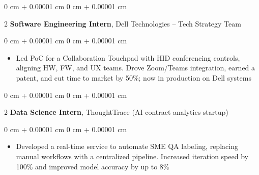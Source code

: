 \documentclass[10pt, letterpaper]{article}
\newenvironment{highlights}{
    \begin{itemize}[
        topsep=0.10 cm,
        parsep=0.10 cm,
        partopsep=0pt,
        itemsep=0pt,
        leftmargin=0 cm + 10pt
    ]
}{
    \end{itemize}
} %
\newenvironment{onecolentry}{
    \begin{adjustwidth}{
        0 cm + 0.00001 cm
    }{
        0 cm + 0.00001 cm
    }
}{
    \end{adjustwidth}
} %
\newenvironment{twocolentry}[2][]{
    \onecolentry
    \def\secondColumn{#2}
    \setcolumnwidth{\fill, 4.5 cm}
    \begin{paracol}{2}
}{
    \switchcolumn \raggedleft \secondColumn
    \end{paracol}
    \endonecolentry
} %
\begin{document}
  \begin{twocolentry}{2020}{\textbf{Software Engineering Intern}, Dell Technologies – Tech Strategy Team}
  \end{twocolentry}
  \vspace{0.1cm}
  \begin{onecolentry}
    \begin{highlights}
      \item Led PoC for a Collaboration Touchpad with HID conferencing controls, aligning HW, FW, and UX teams. Drove Zoom/Teams integration, earned a patent, and cut time to market by 50\%; now in production on Dell systems
    \end{highlights}
  \end{onecolentry}

  \vspace{0.2cm}

  \begin{twocolentry}{2018}{\textbf{Data Science Intern}, ThoughtTrace (AI contract analytics startup)}
  \end{twocolentry}
  \vspace{0.1cm}
  \begin{onecolentry}
    \begin{highlights}
      \item Developed a real-time service to automate SME QA labeling, replacing manual workflows with a centralized pipeline. Increased iteration speed by 100\% and improved model accuracy by up to 8\%
    \end{highlights}
  \end{onecolentry}



\end{document}
